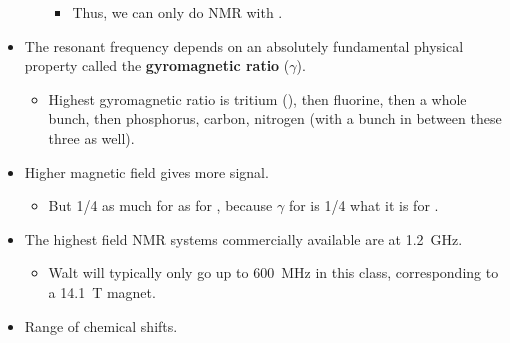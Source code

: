 \documentclass[../notes.tex]{subfiles}
\begin{document}
\begin{itemize}
\begin{itemize}
        \begin{itemize}
            \item Thus, we can only do NMR with .
        \end{itemize}
    \end{itemize}
    \item The resonant frequency depends on an absolutely fundamental physical property called the \textbf{gyromagnetic ratio} ($\gamma$).
    \begin{itemize}
        \item Highest gyromagnetic ratio is tritium (), then fluorine, then a whole bunch, then phosphorus, carbon, nitrogen (with a bunch in between these three as well).
    \end{itemize}
    \item Higher magnetic field gives more signal.
    \begin{itemize}
        \item But 1/4 as much for  as for , because $\gamma$ for  is 1/4 what it is for .
    \end{itemize}
    \item The highest field NMR systems commercially available are at \SI{1.2}{\giga\hertz}.
    \begin{itemize}
        \item Walt will typically only go up to \SI{600}{\mega\hertz} in this class, corresponding to a \SI{14.1}{\tesla} magnet.
    \end{itemize}
    \pagebreak
    \item Range of chemical shifts.
    \begin{figure}[h!]
        \centering
\end{figure}
\end{itemize}
\end{document}
